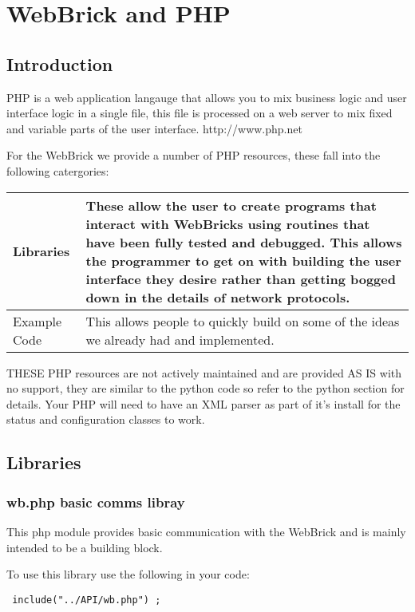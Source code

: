 \section{WebBrick and PHP}

\subsection{Introduction}

PHP is a web application langauge that allows you to mix business logic and user interface logic in a single file, this file
is processed on a web server to mix fixed and variable parts of the user interface. http://www.php.net

For the WebBrick we provide a number of PHP resources, these fall into the following catergories:

\begin{tabular}{l|p{12cm}}
    \hline
	Libraries&These allow the user to create programs that interact with WebBricks
				using routines that have been fully tested and debugged.  This allows
				the programmer to get on with building the user interface they desire rather
				than getting bogged down in the details of network protocols.\\
    \hline
	Example Code&This allows people to quickly build on some of the ideas we already had and
				implemented.\\
\end{tabular}

THESE PHP resources are not actively maintained and are provided AS IS with no support, they are similar to the python
code so refer to the python section for details. Your PHP will need to have an XML parser as part of it's install for the
status and configuration classes to work.

\subsection{Libraries}

\subsubsection{wb.php basic comms libray}

This php module provides basic communication with the WebBrick and is mainly intended to be a building block.

To use this library use the following in your code:

\begin{verbatim} include("../API/wb.php") ;\end{verbatim}

